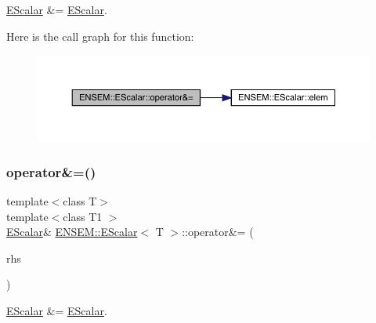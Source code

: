 \mbox{\hyperlink{classENSEM_1_1EScalar}{E\+Scalar}} \&= \mbox{\hyperlink{classENSEM_1_1EScalar}{E\+Scalar}}. 

Here is the call graph for this function\+:
\nopagebreak
\begin{figure}[H]
\begin{center}
\leavevmode
\includegraphics[width=350pt]{d0/d82/classENSEM_1_1EScalar_a4e16e2cecacdfefd6f01dcc360c6945b_cgraph}
\end{center}
\end{figure}
\mbox{\label{classENSEM_1_1EScalar_a4e16e2cecacdfefd6f01dcc360c6945b}} 
\subsubsection{\texorpdfstring{operator\&=()}{operator\&=()}\hspace{0.1cm}{\footnotesize\ttfamily [2/2]}}
{\footnotesize\ttfamily template$<$class T$>$ \\
template$<$class T1 $>$ \\
\mbox{\hyperlink{classENSEM_1_1EScalar}{E\+Scalar}}\& \mbox{\hyperlink{classENSEM_1_1EScalar}{E\+N\+S\+E\+M\+::\+E\+Scalar}}$<$ T $>$\+::operator\&= (\begin{DoxyParamCaption}\item[{const \mbox{\hyperlink{classENSEM_1_1EScalar}{E\+Scalar}}$<$ T1 $>$ \&}]{rhs }\end{DoxyParamCaption})\hspace{0.3cm}{\ttfamily [inline]}}



\mbox{\hyperlink{classENSEM_1_1EScalar}{E\+Scalar}} \&= \mbox{\hyperlink{classENSEM_1_1EScalar}{E\+Scalar}}. 

